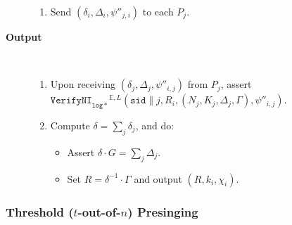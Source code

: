 \documentclass[11pt]{article}
\newcommand{\sid}{\ensuremath{\mathtt{sid}}}
\newcommand{\verifyni}[1]{\ensuremath{\mathtt{VerifyNI}_{\mathtt{#1}}}}
\newcommand{\E}{\mathbb{E}}
\newcommand{\?}[1]{\stackrel{?}{#1}}
\begin{document}
\begin{description}
\begin{enumerate}
        \item Send $(\delta_i, \Delta_i, \psi''_{j,i})$ to each $P_j$.
    \end{enumerate}

    \item[\textbf{Output}] \
    \begin{enumerate}
        \item Upon receiving $(\delta_j, \Delta_j, \psi''_{i,j})$ from $P_j$, assert $\verifyni{log*}^{\E,L}(\sid \| j, R_i,(N_j, K_j, \Delta_j, \Gamma), \psi''_{i,j})$.

        \item Compute $\delta = \sum_j \delta_j$, and do:
        \begin{itemize}
            \item Assert $\delta \cdot G = \sum_j \Delta_j$. 
            \item Set $R = \delta^{-1} \cdot \Gamma$ and output $(R, k_i, \chi_i)$.
        \end{itemize}
    \end{enumerate}
\end{description}

\subsubsection{Threshold ($t$-out-of-$n$) Presinging}
\end{document}
